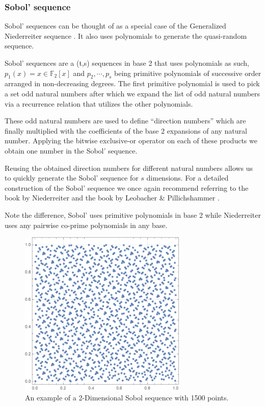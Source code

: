 \documentclass[12pt]{article}
\numberwithin{equation}{section}
\begin{document}
\subsubsection{Sobol' sequence} 
Sobol' sequences can be thought of as a special case of the Generalized Niederreiter sequence \cite{exactnied, SOBOL196786}. It also uses polynomials to generate the quasi-random sequence.
\par Sobol' sequences are a (t,s) sequences in base 2 that uses polynomials as such, $p_1(x)=x \in \mathbb{F}_2[x]$ and $p_2, \cdots, p_s$ being primitive polynomials of successive order arranged in non-decreasing degrees. The first primitive polynomial is used to pick a set odd natural numbers after which we expand the list of odd natural numbers via a recurrence relation that utilizes the other polynomials.\par
These odd natural numbers are used to define ``direction numbers'' which are finally multiplied with the coefficients of the base 2 expansions of any natural number. Applying the bitwise exclusive-or operator on each of these products we obtain one number in the Sobol' sequence.
\par Reusing the obtained direction numbers for different natural numbers allows us to quickly generate the Sobol' sequence for $s$ dimensions. For a detailed construction of the Sobol' sequence we once again recommend referring to the book by Niederreiter \cite{kuipers1974uniform} and the book by Leobacher \& Pillichshammer \cite{leobacher}.
\par Note the difference, Sobol' uses primitive polynomials in base 2 while Niederreiter uses any pairwise co-prime polynomials in any base.
\begin{figure}[!htb]
    \centering
    \includegraphics[width=8cm]{Images/1500sobol.png}
    \caption{An example of a 2-Dimensional Sobol sequence with 1500 points.}
    \label{fig:2dexamplesobol}
\end{figure}
\end{document}
